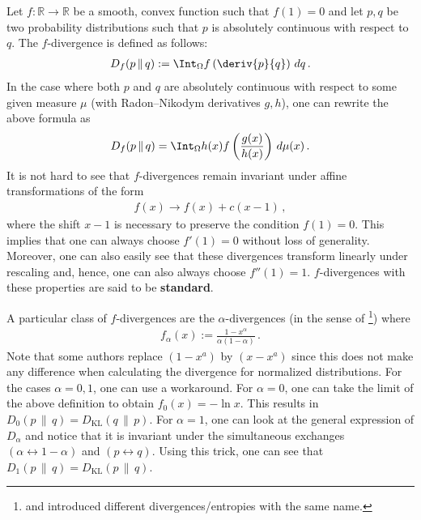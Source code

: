     \begin{example}
        Let $f:\mathbb{R}\rightarrow\mathbb{R}$ be a smooth, convex function such that $f(1)=0$ and let $p,q$ be two probability distributions such that $p$ is absolutely continuous with respect to $q$. The $f$-divergence is defined as follows:
        \begin{gather}
            D_f(p\,\|\,q) := \Int_\Omega f\left(\deriv{p}{q}\right)\,dq\,.
        \end{gather}
        In the case where both $p$ and $q$ are absolutely continuous with respect to some given measure $\mu$ (with Radon--Nikodym derivatives $g,h$), one can rewrite the above formula as
        \begin{gather}
            D_f(p\,\|\,q) = \Int_\Omega h(x)f\left(\frac{g(x)}{h(x)}\right)\,d\mu(x)\,.
        \end{gather}
        It is not hard to see that $f$-divergences remain invariant under affine transformations of the form
        \begin{gather}
            f(x)\longrightarrow f(x) + c(x-1)\,,
        \end{gather}
        where the shift $x-1$ is necessary to preserve the condition $f(1)=0$. This implies that one can always choose $f'(1)=0$ without loss of generality. Moreover, one can also easily see that these divergences transform linearly under rescaling and, hence, one can also always choose $f''(1)=1$. $f$-divergences with these properties are said to be \textbf{standard}.

        A particular class of $f$-divergences are the $\alpha$-divergences (in the sense of \footnote{ and  introduced different divergences/entropies with the same name.}) where
        \begin{gather}
            f_\alpha(x) := \frac{1-x^\alpha}{\alpha(1-\alpha)}\,.
        \end{gather}
        Note that some authors replace $(1-x^a)$ by $(x-x^a)$ since this does not make any difference when calculating the divergence for normalized distributions. For the cases $\alpha=0,1$, one can use a workaround. For $\alpha=0$, one can take the limit of the above definition to obtain $f_0(x) = -\ln x$. This results in $D_0(p\,\|\,q) = D_{\text{KL}}(q\,\|\,p)$. For $\alpha=1$, one can look at the general expression of $D_\alpha$ and notice that it is invariant under the simultaneous exchanges $(\alpha\leftrightarrow1-\alpha)$ and $(p\leftrightarrow q)$. Using this trick, one can see that $D_1(p\,\|\,q) = D_{\text{KL}}(p\,\|\,q)$.
    \end{example}

